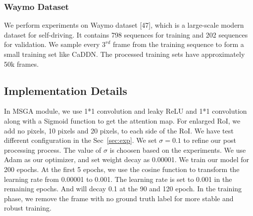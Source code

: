 \documentclass[journal]{IEEEtran}
\begin{document}
	\subsubsection{Waymo Dataset}
	We perform experiments on Waymo dataset [47], which is a large-scale modern dataset for self-driving. It contains 798 sequences for training and 202 sequences for validation. We sample every $3^{rd}$ frame from the training sequence to form a small training set like CaDDN. The processed training sets have approximately 50k frames.
	
	\subsection{Implementation Details}
	In MSGA module, we use 1*1 convolution and leaky ReLU and 1*1 convolution along with a Sigmoid function to get the attention map. For enlarged RoI, we add no pixels, 10 pixels and 20 pixels, to each side of the RoI. We have test different configuration in the Sec~\ref{sec:exp}. We set $\sigma=0.1$ to refine our post processing process. The value of $\sigma$ is choosen based on the experiments. We use Adam as our optimizer, and set weight decay as 0.00001. We train our model for 200 epochs. At the first 5 epochs, we use the cosine function to transform the learning rate from 0.00001 to 0.001. The learning rate is set to 0.001 in the remaining epochs. And will decay 0.1 at the 90 and 120 epoch. In the training phase, we remove the frame with no ground truth label for more stable and robust training. 
	
\end{document}
